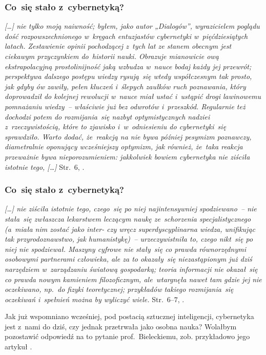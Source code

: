 \documentclass[10pt,t]{beamer}
\begin{document}
\begin{frame}
  \frametitle{Co~się stało z~cybernetyką?}


  \textit{[\ldots] nie tylko moją naiwność; byłem, jako autor „Dialogów”,
    wyrazicielem poglądu dość
    rozpowszechnionego w~kręgach entuzjastów cybernetyki w~pięćdziesiątych
    latach. Zestawienie opinii pochodzącej z~tych lat ze stanem obecnym jest
    ciekawym przyczynkiem do~historii nauki. Obrazuje mianowicie ową
    ekstrapolacyjną prostolinijność jaką wzbudza w~nauce bodaj każdy jej
    przewrót; perspektywa dalszego postępu wiedzy rysują~się wtedy
    współczesnym tak prosto, jak gdyby ów zawiły, pełen kluczeń i~ślepych
    zaułków ruch poznawania, który doprowadził do kolejnej rewolucji
    w~nauce miał ustać i~ustąpić drogi lawinowemu pomnażaniu wiedzy~--
    właściwie już bez odwrotów i~przeszkód. Regularnie też dochodzi potem
    do rozmijania~się nazbyt optymistycznych nadziei z~rzeczywistością,
    które to zjawisko i~w~odniesieniu do cybernetyki~się sprawdziło. Warto
    dodać, że~reakcją na nie bywa później pesymizm poznawczy, diametralnie
    oponujący wcześniejszy optymizm, jak również, że~taka reakcja przeważnie
    bywa nieporozumieniem: jakkolwiek bowiem cybernetyka nie ziściła
    istotnie tego, [\ldots]}
  Str.~$6$, \parencite{Lem-Dialogi-Vol-I-Pub-1996}.

\end{frame}





\begin{frame}
  \frametitle{Co~się stało z~cybernetyką?}


  \textit{[\ldots] nie ziściła istotnie tego, czego~się po niej najintensywniej
    spodziewano~-- nie stała~się zwłaszcza lekarstwem leczącym naukę
    ze~schorzenia specjalistycznego (a~miała nim zostać jako inter- czy
    wręcz superdyscyplinarna wiedza, unifikując tak przyrodoznawstwo, jak
    humanistykę)~-- urzeczywistniła to, czego nikt~się po niej nie
    spodziewał. Maszyny cyfrowe nie stały~się co prawda równorzędnymi
    osobowymi partnerami człowieka, ale za to okazały~się niezastąpionym
    już dziś narzędziem w~zarządzaniu światową gospodarką; teoria
    informacji nie okazał~się co prawda nowym kamieniem filozoficznym,
    ale~wtargnęła nawet tam gdzie jej nie oczekiwano, np.~do fizyki
    teoretycznej; przykładów takiego rozmijania~się oczekiwań i~spełnień
    można by wyliczyć wiele.}
  Str.~$6\text{--}7$, \parencite{Lem-Dialogi-Vol-I-Pub-1996}.

  Jak już wspomniano wcześniej, pod postacią sztucznej inteligencji,
  cybernetyka jest z~nami do dziś, czy jednak przetrwała jako osobna nauka?
  Wolałbym pozostawić odpowiedź na to pytanie prof.~Bieleckiemu, zob.
  przykładowo jego artykuł
  \parencite{Bielecki-Cybernetyka-Slowniki-spoleczne-Vol-XIII-Ver-2025}.

\end{frame}
\end{document}
